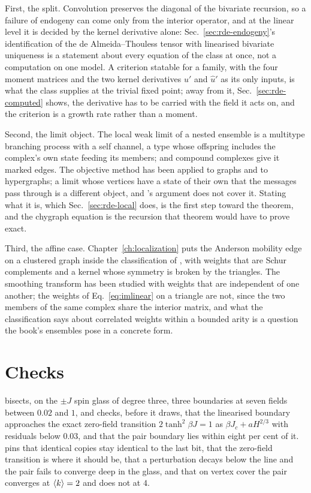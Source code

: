 First, the split. Convolution preserves the diagonal of the bivariate
recursion, so a failure of endogeny can come only from the interior
operator, and at the linear level it is decided by the kernel derivative
alone: Sec.~\ref{sec:rde-endogeny}'s identification of the de
Almeida--Thouless tensor with linearised bivariate uniqueness is a
statement about every equation of the class at once, not a computation on
one model. A criterion statable for a family, with the four moment
matrices and the two kernel derivatives $u'$ and $\hat u'$ as its only
inputs, is what the class supplies at the trivial fixed point; away from
it, Sec.~\ref{sec:rde-computed} shows, the derivative has to be carried
with the field it acts on, and the criterion is a growth rate rather than
a moment.

Second, the limit object. The local weak limit of a nested ensemble is a
multitype branching process with a self channel, a type whose offspring
includes the complex's own state feeding its members; and compound
complexes give it marked edges. The objective method has been applied to
graphs and to hypergraphs; a limit whose vertices have a state of their own
that the messages pass through is a different object, and
\citet{dembo2013}'s argument does not cover it. Stating what it is, which
Sec.~\ref{sec:rde-local} does, is the first step toward the theorem, and
the chygraph equation is the recursion that theorem would have to prove
exact.

Third, the affine case. Chapter~\ref{ch:localization} puts the Anderson
mobility edge on a clustered graph inside the classification of
\citet{alsmeyer2012}, with weights that are Schur complements and a
kernel whose symmetry is broken by the triangles. The smoothing transform
has been studied with weights that are independent of one another; the
weights of Eq.~\eqref{eq:imlinear} on a triangle are not, since the two
members of the same complex share the interior matrix, and what the
classification says about correlated weights within a bounded arity is a
question the book's ensembles pose in a concrete form.

\section{Checks}
\label{sec:rde-checks}

bisects, on the $\pm J$ spin glass of degree three, three boundaries at
seven fields between $0.02$ and $1$, and
 checks, before it draws,
that the linearised boundary approaches the exact zero-field transition
$2\tanh^{2}\beta J=1$ as $\beta J_{c}+aH^{2/3}$ with residuals below
$0.03$, and that the pair boundary lies within eight per cent of it.
 pins that identical copies stay identical to the
last bit, that the zero-field transition is where it should be, that a
perturbation decays below the line and the pair fails to converge deep in
the glass, and that on vertex cover the pair converges at $\langle k \rangle=2$ and
does not at $4$.

